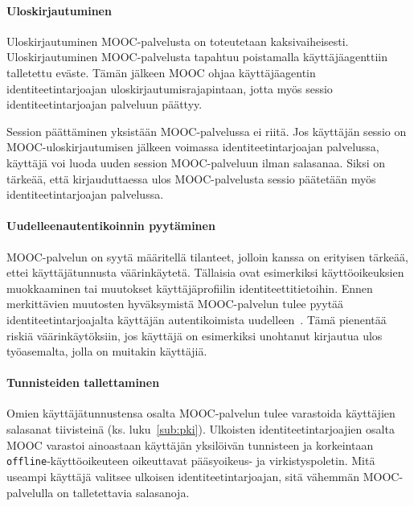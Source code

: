 \documentclass[finnish,gradu]{tktltiki}
\begin{document}

  \paragraph{Uloskirjautuminen} \hfill %
  \label{par:uloskirjautumisesta}

  Uloskirjautuminen MOOC-palvelusta on toteutetaan kaksivaiheisesti. Uloskirjautuminen MOOC-palvelusta tapahtuu poistamalla käyttäjäagenttiin talletettu eväste. Tämän jälkeen MOOC ohjaa käyttäjäagentin identiteetintarjoajan uloskirjautumisrajapintaan, jotta myös sessio identiteetintarjoajan palveluun päättyy.

  Session päättäminen yksistään MOOC-palvelussa ei riitä. Jos käyttäjän sessio on MOOC-uloskirjautumisen jälkeen voimassa identiteetintarjoajan palvelussa, käyttäjä voi luoda uuden session MOOC-palveluun ilman salasanaa. Siksi on tärkeää, että kirjauduttaessa ulos MOOC-palvelusta sessio päätetään myös identiteetintarjoajan palvelussa.


  \paragraph{Uudelleenautentikoinnin pyytäminen} \hfill %
  \label{par:pakotettu_uudelleenautentikointi}

  MOOC-palvelun on syytä määritellä tilanteet, jolloin kanssa on erityisen tärkeää, ettei käyttäjätunnusta väärinkäytetä. Tällaisia ovat esimerkiksi käyttöoikeuksien muokkaaminen tai muutokset käyttäjäprofiilin identiteettitietoihin. Ennen merkittävien muutosten hyväksymistä MOOC-palvelun tulee pyytää identiteetintarjoajalta käyttäjän autentikoimista uudelleen~\cite{facebook_oauth2_reauth, google_oauth2_webserver}. Tämä pienentää riskiä väärinkäytöksiin, jos käyttäjä on esimerkiksi unohtanut kirjautua ulos työasemalta, jolla on muitakin käyttäjiä.


  \paragraph{Tunnisteiden tallettaminen} \hfill %
  \label{par:tietoturva}

  Omien käyttäjätunnustensa osalta MOOC-palvelun tulee varastoida käyttäjien salasanat tiivisteinä (ks. luku~\ref{sub:pki}). Ulkoisten identiteetintarjoajien osalta MOOC varastoi ainoastaan käyttäjän yksilöivän tunnisteen ja korkeintaan \verb!offline!-käyttöoikeuteen oikeuttavat pääsyoikeus- ja virkistyspoletin. Mitä useampi käyttäjä valitsee ulkoisen identiteetintarjoajan, sitä vähemmän MOOC-palvelulla on talletettavia salasanoja.
\end{document}
